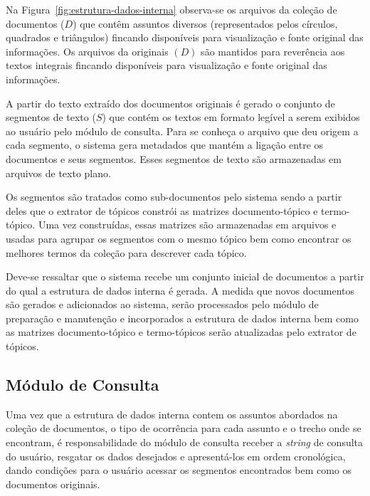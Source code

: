 Na Figura~\ref{fig:estrutura-dados-interna} observa-se os arquivos da coleção de documentos ($D$) que contêm assuntos diversos (representados pelos círculos, quadrados e triângulos) fincando disponíveis para visualização e fonte original das informações. Os arquivos da originais $(D)$ são mantidos para reverência aos textos integrais fincando disponíveis para visualização e fonte original das informações. 

A partir do texto extraído dos documentos originais é gerado o conjunto de segmentos de texto ($S$) que contém os textos em formato legível a serem exibidos ao usuário pelo módulo de consulta. Para se conheça o arquivo que deu origem a cada segmento, o sistema gera metadados que mantém a ligação entre os documentos e seus segmentos. Esses segmentos de texto são armazenadas em arquivos de texto plano. 

Os segmentos são tratados como sub-documentos pelo sistema sendo a partir deles que o extrator de tópicos constrói as matrizes documento-tópico e termo-tópico. Uma vez construídas, essas matrizes são armazenadas em arquivos e usadas para agrupar os segmentos com o mesmo tópico bem como encontrar os melhores termos da coleção para descrever cada tópico.

Deve-se ressaltar que o sistema recebe um conjunto inicial de documentos a partir do qual a estrutura de dados interna é gerada. A medida que novos documentos são gerados e adicionados ao sistema, serão processados pelo módulo de preparação e manutenção e incorporados a estrutura de dados interna bem como as matrizes documento-tópico e termo-tópicos serão atualizadas pelo extrator de tópicos.





\subsection{Módulo de Consulta}


Uma vez que a estrutura de dados interna contem os assuntos abordados na coleção de documentos, o tipo de ocorrência para cada assunto e o trecho onde se encontram, 
é responsabilidade do módulo de consulta receber a \textit{string} de consulta do usuário, resgatar os dados desejados e apresentá-los em ordem cronológica, dando condições para o usuário acessar os segmentos encontrados bem como os documentos originais.


